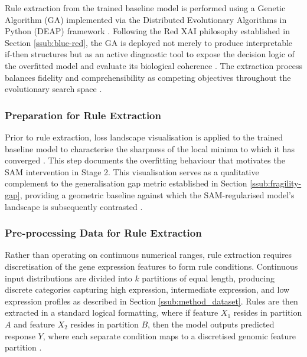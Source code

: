 \label{sub:method_ga}
Rule extraction from the trained baseline model is performed using a Genetic 
Algorithm (GA) implemented via the Distributed Evolutionary Algorithms in Python 
(DEAP) framework \cite{Yedjour2024}. Following the Red XAI philosophy established in 
Section \ref{ssub:blue-red}, the GA is deployed not merely to produce 
interpretable if-then structures but as an active diagnostic tool to expose the 
decision logic of the overfitted model and evaluate its biological coherence 
\cite{Biecek2024}. The extraction process balances fidelity and comprehensibility 
as competing objectives throughout the evolutionary search space \cite{Yedjour2024}.

\subsubsection{Preparation for Rule Extraction}
\label{ssub:method_ga_rule_extraction}
Prior to rule extraction, loss landscape visualisation is applied to the trained 
baseline model to characterise the sharpness of the local minima to which it has 
converged \cite{Li2018}. This step documents the overfitting behaviour that 
motivates the SAM intervention in Stage 2. This visualisation serves as a 
qualitative complement to the generalisation gap metric established in Section 
\ref{ssub:fragility-gap}, providing a geometric baseline against which the 
SAM-regularised model's landscape is subsequently contrasted \cite{Li2018}.

\subsubsection{Pre-processing Data for Rule Extraction}
\label{ssub:method_ga_processing}
Rather than operating on continuous numerical ranges, rule extraction requires 
discretisation of the gene expression features to form rule conditions. 
Continuous input distributions are divided into $k$ partitions of equal length, 
producing discrete categories capturing high expression, intermediate expression, 
and low expression profiles as described in Section \ref{ssub:method_dataset}. 
Rules are then extracted in a standard logical formatting, where if feature $X_1$ 
resides in partition $A$ and feature $X_2$ resides in partition $B$, then the 
model outputs predicted response $Y$, where each separate condition maps to a 
discretised genomic feature partition \cite{Yedjour2024}.

